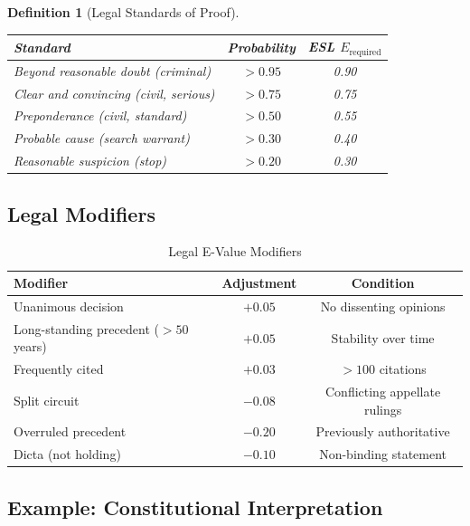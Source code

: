 \documentclass[11pt,a4paper]{article}
\newtheorem{definition}{Definition}[section]
\theoremstyle{remark}
\begin{document}
\begin{definition}[Legal Standards of Proof]
\label{def:legal-standards}
\begin{center}
\begin{tabular}{lcc}
\toprule
\textbf{Standard} & \textbf{Probability} & \textbf{ESL $E_{\text{required}}$} \\
\midrule
Beyond reasonable doubt (criminal) & $>0.95$ & 0.90 \\
Clear and convincing (civil, serious) & $>0.75$ & 0.75 \\
Preponderance (civil, standard) & $>0.50$ & 0.55 \\
Probable cause (search warrant) & $>0.30$ & 0.40 \\
Reasonable suspicion (stop) & $>0.20$ & 0.30 \\
\bottomrule
\end{tabular}
\end{center}
\end{definition}

\subsection{Legal Modifiers}

\begin{table}[h]
\centering
\caption{Legal E-Value Modifiers}
\label{tab:law-modifiers}
\begin{tabular}{lcc}
\toprule
\textbf{Modifier} & \textbf{Adjustment} & \textbf{Condition} \\
\midrule
Unanimous decision & $+0.05$ & No dissenting opinions \\
Long-standing precedent ($>50$ years) & $+0.05$ & Stability over time \\
Frequently cited & $+0.03$ & $>100$ citations \\
Split circuit & $-0.08$ & Conflicting appellate rulings \\
Overruled precedent & $-0.20$ & Previously authoritative \\
Dicta (not holding) & $-0.10$ & Non-binding statement \\
\bottomrule
\end{tabular}
\end{table}

\subsection{Example: Constitutional Interpretation}
\end{document}
